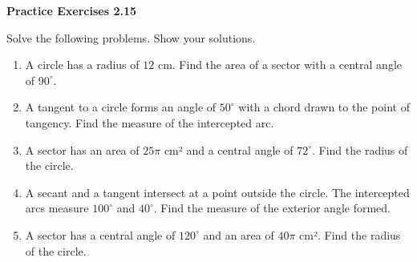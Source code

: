 \vspace{0.3ex}
\noindent\textbf{Practice Exercises 2.15}

\vspace{0.2ex}

Solve the following problems. Show your solutions.

\begin{enumerate}
    \item A circle has a radius of $12$ cm. Find the area of a sector with a central angle of $90^\circ$.
    \item A tangent to a circle forms an angle of $50^\circ$ with a chord drawn to the point of tangency. Find the measure of the intercepted arc.
    \item A sector has an area of $25\pi$ cm² and a central angle of $72^\circ$. Find the radius of the circle.
    \item A secant and a tangent intersect at a point outside the circle. The intercepted arcs measure $100^\circ$ and $40^\circ$. Find the measure of the exterior angle formed.
    \item A sector has a central angle of $120^\circ$ and an area of $40\pi$ cm². Find the radius of the circle.
\end{enumerate}
